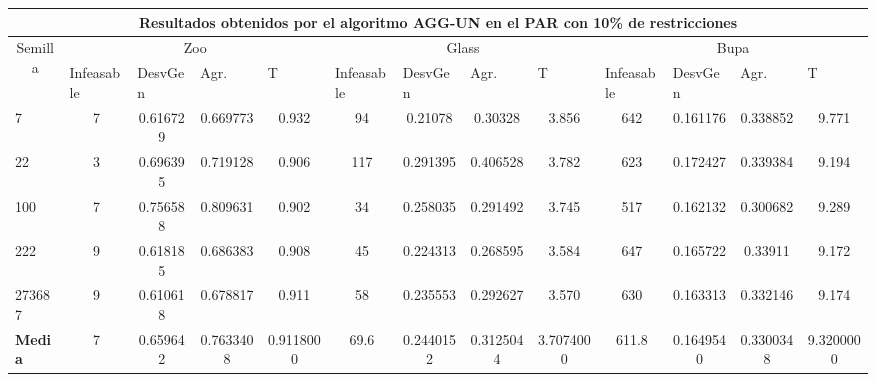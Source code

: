 \begin{table}[H]
	\tiny

	\begin{adjustwidth}{-1cm}{-1cm}%
	
	\begin{tabular}{|l|c|c|c|c|c|c|c|c|c|c|c|c|}
	\hline
	\multicolumn{13}{|c|}{\textbf{Resultados obtenidos por el algoritmo AGG-UN en el PAR con 10\% de restricciones}}                                                                                                                                                                                                                                                                                                                                            \\ \hline
	\multicolumn{1}{|c|}{\multirow{2}{*}{Semilla}} & \multicolumn{4}{c|}{Zoo}                                                                                          & \multicolumn{4}{c|}{Glass}                                                                                         & \multicolumn{4}{c|}{Bupa}                                                                                          \\ \cline{2-13} 
	\multicolumn{1}{|c|}{}                                  & \multicolumn{1}{l|}{Infeasable} & \multicolumn{1}{l|}{DesvGen} & \multicolumn{1}{l|}{Agr.} & \multicolumn{1}{l|}{T} & \multicolumn{1}{l|}{Infeasable} & \multicolumn{1}{l|}{DesvGen} & \multicolumn{1}{l|}{Agr.} & \multicolumn{1}{l|}{T} & \multicolumn{1}{l|}{Infeasable} & \multicolumn{1}{l|}{DesvGen} & \multicolumn{1}{l|}{Agr.} & \multicolumn{1}{l|}{T} \\ \hline
	7   	& 7 & 0.616729 & 0.669773 & 0.932 & 			94 & 0.21078 & 0.30328 & 3.856 &			 	642 & 0.161176 & 0.338852 & 9.771 		\\ \hline
	22 		& 3 & 0.696395 & 0.719128 &	0.906 &			117 & 0.291395 & 0.406528 &	3.782 &		 	623 & 0.172427 & 0.339384 &	9.194		\\ \hline
	100 	& 7 & 0.756588 & 0.809631 &	0.902 &			34 & 0.258035 & 0.291492 & 	3.745 &			517 & 0.162132 & 0.300682 &	9.289		\\ \hline
	222 	& 9 & 0.618185 & 0.686383 & 0.908 &			45 & 0.224313 & 0.268595 & 	3.584 &			647 & 0.165722 & 0.33911 &	9.172		\\ \hline
	273687 	& 9 & 0.610618 & 0.678817 & 0.911 & 			58 & 0.235553 & 0.292627 & 	3.570 &			630 & 0.163313 & 0.332146 &	9.174		\\ \hline
	\textbf{Media} &  7 & 	0.659642 & 	0.7633408 & 	0.9118000 & 	69.6 & 	0.2440152 & 	0.3125044 & 	3.7074000 & 	611.8 & 	0.1649540 & 	0.3300348 & 	9.3200000   \\ \hline
	\end{tabular}
	
	\end{adjustwidth}
	
\end{table}	

